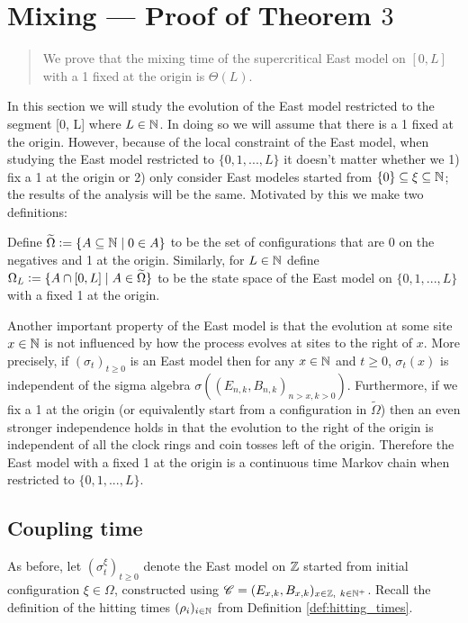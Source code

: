 \section{Mixing --- Proof of Theorem $3$}
\begin{quote}
{\small We prove that the mixing time of the supercritical East model on $[0, L]$ with a 1 fixed at the origin is $\Theta(L)$. }
\end{quote}

In this section we will study the evolution of the East model restricted to the segment [0, L] where $L \in \mathbb{N}$. In doing so we will assume that there is a 1 fixed at the origin. However, because of the local constraint of the East model, when studying the East model restricted to $\{0, 1, ..., L\}$ it doesn't matter whether we 1) fix a 1 at the origin or 2) only consider East modeles started from $\{0\} \subseteq \xi \subseteq \mathbb{N}$; the results of the analysis will be the same. Motivated by this we make two definitions:

\begin{definition}
Define $\widetilde{\Omega} \vcentcolon= \{A \subseteq \mathbb{N} \mid 0 \in A \}$ to be the set of configurations that are 0 on the negatives and 1 at the origin. Similarly, for $L \in \mathbb{N}$ define $\Omega_L \vcentcolon= \{ A \cap [0, L] \mid A \in \widetilde{\Omega} \}$ to be the state space of the East model on $\{0, 1, ..., L\}$ with a fixed 1 at the origin. 
\end{definition}

Another important property of the East model is that the evolution at some site $x \in \mathbb{N}$ is not influenced by how the process evolves at sites to the right of $x$. More precisely, if $(\sigma_t)_{t \geq 0}$ is an East model then for any $x \in \mathbb{N}$ and $t \geq 0$, $\sigma_t (x)$ is independent of the sigma algebra $\sigma \left( (E_{n,k}, B_{n,k})_{n > x, k > 0}\right)$. Furthermore, if we fix a 1 at the origin (or equivalently start from a configuration in $\widetilde{\Omega}$) then an even stronger independence holds in that the evolution to the right of the origin is independent of all the clock rings and coin tosses left of the origin. Therefore the East model with a fixed 1 at the origin is a continuous time Markov chain when restricted to $\{0, 1, ..., L\}$. 

\subsection{Coupling time}
As before, let $(\sigma^\xi_t)_{t \geq 0}$ denote the East model on $\mathbb{Z}$ started from initial configuration $\xi \in \Omega$, constructed using $\mathscr{C} = (E_{x,k}, B_{x,k})_{x \in \mathbb{Z},\ k \in \mathbb{N}^+}$. Recall the definition of the hitting times $(\rho_i)_{i \in \mathbb{N}}$ from Definition \ref{def:hitting_times}.  


